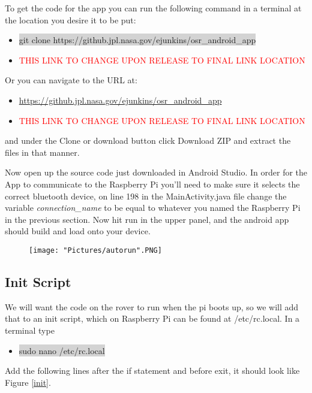 \documentclass[12pt]{article}
\begin{document}
\bigskip

\noindent To get the code for the app you can run the following command in a terminal at the location you desire it to be put:

\begin{itemize}
	\item[] \colorbox{lightgray}{git clone https://github.jpl.nasa.gov/ejunkins/osr\_android\_app}
	\item[] \textcolor{red}{THIS LINK TO CHANGE UPON RELEASE TO FINAL LINK LOCATION}
\end{itemize}

\noindent Or you can navigate to the URL at:

\begin{itemize}
	\item[] \href{https://github.jpl.nasa.gov/ejunkins/osr_android_app}{https://github.jpl.nasa.gov/ejunkins/osr\_android\_app}
	\item[] \textcolor{red}{THIS LINK TO CHANGE UPON RELEASE TO FINAL LINK LOCATION}
\end{itemize}

\noindent and under the Clone or download button click Download ZIP and extract the files in that manner. 

\bigskip

\noindent Now open up the source code just downloaded in Android Studio. In order for the App to communicate to the Raspberry Pi you'll need to make sure it selects the correct bluetooth device, on line 198 in the MainActivity.java file change the variable \textit{connection\_name} to be equal to whatever you named the Raspberry Pi in the previous section. Now hit run in the upper panel, and the android app should build and load onto your device. 

\begin{figure}[H]
 	\centering
	\texttt{[image: "Pictures/autorun".PNG]}
 	\caption{}
	\label{}
\end{figure}


\subsection{Init Script}
We will want the code on the rover to run when the pi boots up, so we will add that to an init script, which on Raspberry Pi can be found at /etc/rc.local. In a terminal type
\begin{itemize}
	\item[] \colorbox{lightgray}{sudo nano /etc/rc.local}
\end{itemize}
\noindent Add the following lines after the if statement and before exit, it should look like Figure \ref{init}.
\end{document}
